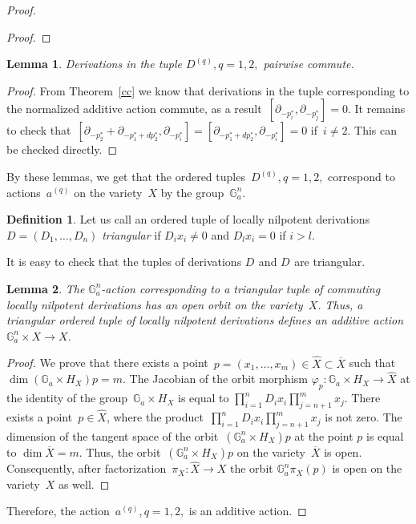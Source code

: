 \documentclass[a4paper,reqno,12pt]{amsart}
\DeclareMathOperator {\dimm}{dim}
\DeclareMathOperator {\NNA}{(2)}
\DeclareMathOperator {\NA}{(1)}
\def\Ga  {\mathbb G_a}
\newtheorem{lmm}{Lemma}
\theoremstyle{definition}
\newtheorem{defn}{Definition}
\begin{document}
\begin{proof}
\begin{proof}
  \end{proof}
  \begin{lmm}
    Derivations in the tuple $D^{(q)}, q=1,2,$ pairwise commute.
  \end{lmm}
  \begin{proof}
    From Theorem~\ref{cc} we know that derivations in the tuple corresponding to the normalized additive action commute, as a result~${[\partial_{-p_i^*}, \partial_{-p_j^*}]=0}$.
    It remains to check that~${[\partial_{-p_2^*}+\partial_{-p_1^*+dp_2^*}, \partial_{-p_i^*}]=[\partial_{-p_1^*+dp_2^*}, \partial_{-p_i^*}]=0}$ if~${i \neq 2}$.
    This can be checked directly.
  \end{proof}
    By these lemmas, we get that the ordered tuples~$D^{(q)}, q=1,2,$ correspond to  actions~$a^{(q)}$ on the variety~$X$ by the group~$\Ga^n$.


  \begin{defn}
    Let us call an ordered tuple of locally nilpotent derivations~$D=(D_1, \ldots, D_n)$ \emph{triangular} if $D_ix_i \neq 0$ and $D_l x_i =0$ if $i > l$.
  \end{defn}
  It is easy to check that the tuples of derivations $D^{\NA}$ and $D^{\NNA}$ are triangular.
  \begin{lmm}
    The $\Ga^n$-action corresponding to a triangular tuple of commuting locally nilpotent derivations has an open orbit on the variety~$X$.
    Thus, a triangular ordered tuple of locally nilpotent derivations defines an additive action $\Ga^n \times X \to X$.
  \end{lmm}
  \begin{proof}
    
    We prove that there exists a point~${p =(x_1, \ldots, x_m)\in \widehat{X}\subset \overline{X}}$ such that ${\dimm (\Ga \times H_X) p=m}$.
    The Jacobian of the orbit morphism $\varphi_p \colon \Ga \times H_X \to \widehat{X}$ at the identity of the group~$\Ga\times H_X$ is equal to $\prod\limits_{i=1}^nD_ix_i\prod\limits_{j=n+1}^mx_j$.
    There exists a point~${p\in\widehat{X}}$, where the product~${\prod\limits_{i=1}^nD_ix_i\prod\limits_{j=n+1}^mx_j}$ is not zero.
    The dimension of the tangent space of the orbit~$(\Ga^n\times H_X)p$ at the point $p$ is equal to $\dim \overline{X}=m$.
    Thus, the orbit~$(\Ga^n\times H_X)p$ on the variety~$\overline{X}$ is open.
    Consequently, after factorization~$\pi_X: \widehat{X} \to X$ the orbit $\Ga^n\pi_X(p)$ is open on the variety~$X$ as well.
  \end{proof}
      Therefore, the action~$a^{(q)}, q=1,2,$ is an additive action.


\end{proof}
\end{document}
